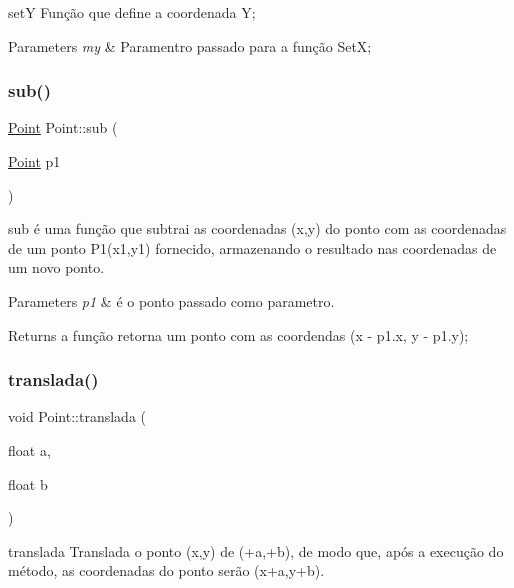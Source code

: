 setY Função que define a coordenada Y; 


\begin{DoxyParams}{Parameters}
{\em my} & Paramentro passado para a função SetX; \\
\hline
\end{DoxyParams}
\mbox{\label{class_point_a9cf2c53b0a4e6282a6712824bb4e9b00}} 
\subsubsection{\texorpdfstring{sub()}{sub()}}
{\footnotesize\ttfamily \mbox{\hyperlink{class_point}{Point}} Point\+::sub (\begin{DoxyParamCaption}\item[{\mbox{\hyperlink{class_point}{Point}}}]{p1 }\end{DoxyParamCaption})}



sub é uma função que subtrai as coordenadas (x,y) do ponto com as coordenadas de um ponto P1(x1,y1) fornecido, armazenando o resultado nas coordenadas de um novo ponto. 


\begin{DoxyParams}{Parameters}
{\em p1} & é o ponto passado como parametro. \\
\hline
\end{DoxyParams}
\begin{DoxyReturn}{Returns}
a função retorna um ponto com as coordendas (x -\/ p1.\+x, y -\/ p1.\+y); 
\end{DoxyReturn}
\mbox{\label{class_point_ad9676e36f3444534b609e3c68422239a}} 
\subsubsection{\texorpdfstring{translada()}{translada()}}
{\footnotesize\ttfamily void Point\+::translada (\begin{DoxyParamCaption}\item[{float}]{a,  }\item[{float}]{b }\end{DoxyParamCaption})}



translada Translada o ponto (x,y) de (+a,+b), de modo que, após a execução do método, as coordenadas do ponto serão (x+a,y+b). 


